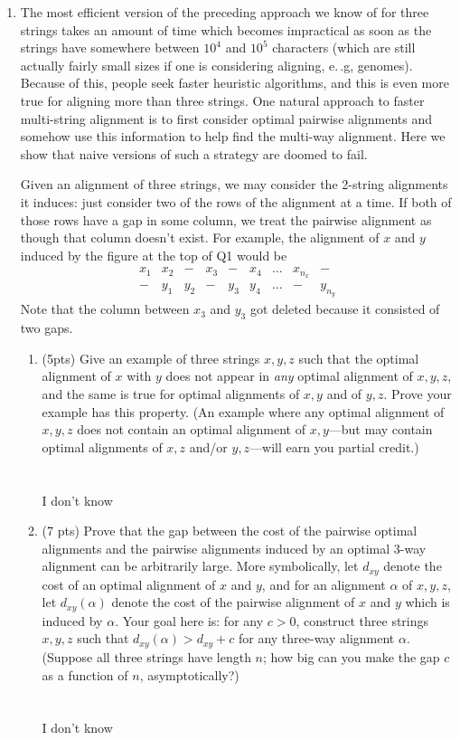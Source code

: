 \documentclass[12pt]{article}
\begin{document}
\begin{enumerate}
\item The most efficient version of the preceding approach we know of for three strings takes an amount of time which becomes impractical as soon as the strings have somewhere between $10^4$ and $10^5$ characters (which are still actually fairly small sizes if one is considering aligning, e.\,.g, genomes). Because of this, people seek faster heuristic algorithms, and this is even more true for aligning more than three strings. One natural approach to faster multi-string alignment is to first consider optimal pairwise alignments and somehow use this information to help find the multi-way alignment. Here we show that naive versions of such a strategy are doomed to fail. 

Given an alignment of three strings, we may consider the 2-string alignments it induces: just consider two of the rows of the alignment at a time. If both of those rows have a gap in some column, we treat the pairwise alignment as though that column doesn't exist. For example, the alignment of $x$ and $y$ induced by the figure at the top of Q1 would be
\[
\begin{array}{ccccccccc}
x_1 & x_2 & - & x_3 &  - & x_4 & \dotsc & x_{n_x} & - \\
- & y_1 & y_2 & - &  y_3 & y_4 & \dotsc & - & y_{n_y} 
\end{array}
\]
Note that the column between $x_3$ and $y_3$ got deleted because it consisted of two gaps.
\pagebreak

\begin{enumerate}
\item (5pts) Give an example of three strings $x,y,z$ such that the optimal alignment of $x$ with $y$ does not appear in \emph{any} optimal alignment of $x,y,z$, and the same is true for optimal alignments of $x,y$ and of $y,z$. Prove your example has this property. (An example where any optimal alignment of $x,y,z$ does not contain an optimal alignment of $x,y$---but may contain optimal alignments of $x,z$ and/or $y,z$---will earn you partial credit.)
\\ \\ \\ I don't know
\pagebreak


\item (7 pts) Prove that the gap between the cost of the pairwise optimal alignments and the pairwise alignments induced by an optimal 3-way alignment can be arbitrarily large. More symbolically, let $d_{xy}$ denote the cost of an optimal alignment of $x$ and $y$, and for an alignment $\alpha$ of $x,y,z$, let $d_{xy}(\alpha)$ denote the cost of the pairwise alignment of $x$ and $y$ which is induced by $\alpha$. Your goal here is: for any $c > 0$, construct three strings $x,y,z$ such that $d_{xy}(\alpha) > d_{xy} + c$ for any three-way alignment $\alpha$. (Suppose all three strings have length $n$; how big can you make the gap $c$ as a function of $n$, asymptotically?)
\\ \\ \\ I don't know
\pagebreak


\end{enumerate}
\end{enumerate}
\end{document}
